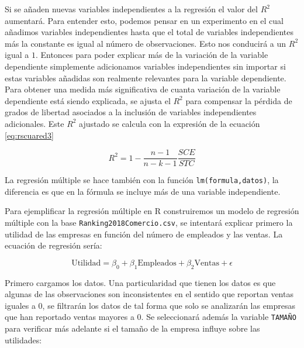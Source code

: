 \documentclass[
]{krantz}
\makeatletter
\newenvironment{Shaded}{\begin{snugshade}}{\end{snugshade}}
\newcommand{\DataTypeTok}[1]{\textcolor[rgb]{0.27,0.27,0.27}{#1}}
\newcommand{\DecValTok}[1]{\textcolor[rgb]{0.06,0.06,0.06}{#1}}
\newcommand{\KeywordTok}[1]{\textcolor[rgb]{0.27,0.27,0.27}{\textbf{#1}}}
\newcommand{\NormalTok}[1]{#1}
\newcommand{\OperatorTok}[1]{\textcolor[rgb]{0.43,0.43,0.43}{\textbf{#1}}}
\newcommand{\OtherTok}[1]{\textcolor[rgb]{0.37,0.37,0.37}{#1}}
\newcommand{\StringTok}[1]{\textcolor[rgb]{0.5,0.5,0.5}{#1}}
\newenvironment{kframe}{%
\medskip{}
\setlength{\fboxsep}{.8em}
 \def\at@end@of@kframe{}%
 \ifinner\ifhmode%
  \def\at@end@of@kframe{\end{minipage}}%
  \begin{minipage}{\columnwidth}%
 \fi\fi%
 \def\FrameCommand##1{\hskip\@totalleftmargin \hskip-\fboxsep
 \colorbox{shadecolor}{##1}\hskip-\fboxsep
     \hskip-\linewidth \hskip-\@totalleftmargin \hskip\columnwidth}%
 \MakeFramed {\advance\hsize-\width
   \@totalleftmargin\z@ \linewidth\hsize
   \@setminipage}}%
 {\par\unskip\endMakeFramed%
 \at@end@of@kframe}
\renewenvironment{Shaded}{\begin{kframe}}{\end{kframe}}
\makeatother
\begin{document}
Si se añaden nuevas variables independientes a la regresión el valor del \(R^2\) aumentará. Para entender esto, podemos pensar en un experimento en el cual añadimos variables independientes hasta que el total de variables independientes más la constante es igual al número de observaciones. Esto nos conducirá a un \(R^2\) igual a \(1\). Entonces para poder explicar más de la variación de la variable dependiente simplemente adicionamos variables independientes sin importar si estas variables añadidas son realmente relevantes para la variable dependiente. Para obtener una medida más significativa de cuanta variación de la variable dependiente está siendo explicada, se ajusta el \(R^2\) para compensar la pérdida de grados de libertad asociados a la inclusión de variables independientes adicionales. Este \(R^2\) ajustado se calcula con la expresión de la ecuación \eqref{eq:rscuared3}

\begin{equation}
R^2 = 1 -\dfrac{n-1}{n-k-1} \dfrac{SCE}{STC}
    \label{eq:rscuared3}
\end{equation}

La regresión múltiple se hace también con la función \texttt{lm(formula,datos)}, la diferencia es que en la fórmula se incluye más de una variable independiente.

Para ejemplificar la regresión múltiple en R construiremos un modelo de regresión múltiple con la base \texttt{Ranking2018Comercio.csv}, se intentará explicar primero la utilidad de las empresas en función del número de empleados y las ventas. La ecuación de regresión sería:

\begin{equation}
  \text{Utilidad} = \beta_0 + \beta_1 \text{Empleados} + \beta_2 \text{Ventas} + \epsilon
    \label{eq:modelo2}
\end{equation}

Primero cargamos los datos. Una particularidad que tienen los datos es que algunas de las observaciones son inconsistentes en el sentido que reportan ventas iguales a 0, se filtrarán los datos de tal forma que solo se analizarán las empresas que han reportado ventas mayores a 0. Se seleccionará además la variable \texttt{TAMAÑO} para verificar más adelante si el tamaño de la empresa influye sobre las utilidades:

\begin{Shaded}
\end{Shaded}
\end{document}
